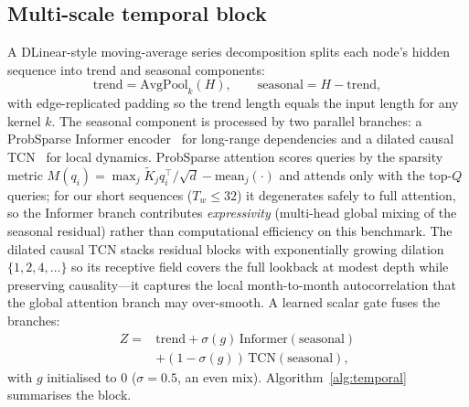 \documentclass[11pt,conference]{IEEEtran}
\begin{document}
\subsection{Multi-scale temporal block}\label{sec:temporal}
A DLinear-style moving-average series decomposition splits each node's hidden
sequence into trend and seasonal components:
\begin{equation}
  \mathrm{trend} = \mathrm{AvgPool}_k(H),\qquad \mathrm{seasonal} = H - \mathrm{trend},
\end{equation}
with edge-replicated padding so the trend length equals the input length for any
kernel $k$. The seasonal component is processed by two parallel branches: a
ProbSparse Informer encoder~\cite{zhou2021informer} for long-range dependencies
and a dilated causal TCN~\cite{bai2018tcn} for local dynamics. ProbSparse
attention scores queries by the sparsity metric
$M(q_i)=\max_j \tilde{K}_j q_i^\top/\sqrt{d}-\mathrm{mean}_j(\cdot)$ and attends
only with the top-$Q$ queries; for our short sequences ($T_w\le 32$) it
degenerates safely to full attention, so the Informer branch contributes
\emph{expressivity} (multi-head global mixing of the seasonal residual) rather
than computational efficiency on this benchmark. The dilated causal TCN stacks
residual blocks with exponentially growing dilation $\{1,2,4,\ldots\}$ so its
receptive field covers the full lookback at modest depth while preserving
causality---it captures the local month-to-month autocorrelation that the
global attention branch may over-smooth. A learned scalar gate fuses the branches:
\begin{equation}\label{eq:gate}
\begin{split}
  Z ={}& \mathrm{trend} + \sigma(g)\,\mathrm{Informer}(\mathrm{seasonal})\\
     & + (1-\sigma(g))\,\mathrm{TCN}(\mathrm{seasonal}),
\end{split}
\end{equation}
with $g$ initialised to $0$ ($\sigma=0.5$, an even mix).
Algorithm~\ref{alg:temporal} summarises the block.
\end{document}
